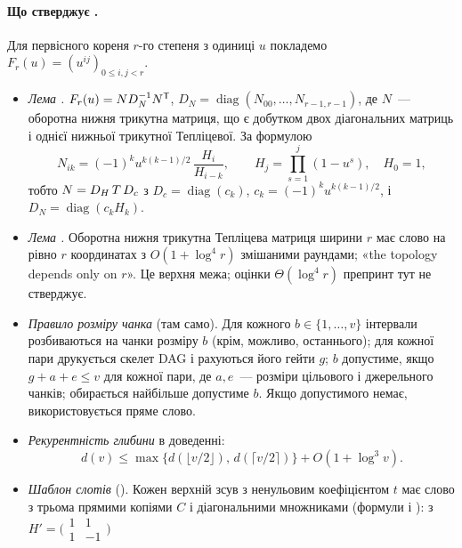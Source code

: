 \documentclass[11pt]{article}
\theoremstyle{plain}
\DeclareMathOperator{\diag}{diag}
\newcommand{\en}[1]{\foreignlanguage{english}{#1}}
\begin{document}
\paragraph{Що стверджує .}
Для первісного кореня $r$-го степеня з одиниці $u$ покладемо $F_r(u)=(u^{ij})_{0\le i,j<r}$.
\begin{itemize}
\item \emph{Лема .} $F_r(u)=N D_N^{-1}N^{\mathsf{T}}$, $D_N=\diag(N_{00},\dots,N_{r-1,r-1})$, де $N$~--- оборотна нижня трикутна матриця, що є добутком двох діагональних матриць і однієї нижньої трикутної Тепліцевої. За формулою 
\begin{equation}\label{eq:newton}
N_{ik}=(-1)^k u^{k(k-1)/2}\,\frac{H_i}{H_{i-k}},\qquad H_j=\prod_{s=1}^{j}(1-u^s),\quad H_0=1,
\end{equation}
тобто $N=D_H\,T\,D_c$ з $D_c=\diag(c_k)$, $c_k=(-1)^k u^{k(k-1)/2}$, і $D_N=\diag(c_kH_k)$.
\item \emph{Лема .} Оборотна нижня трикутна Тепліцева матриця ширини $r$ має слово на рівно $r$ координатах з $O(1+\log^4 r)$ змішаними раундами; «\en{the topology depends only on $r$}». Це верхня межа; оцінки $\Theta(\log^4 r)$ препринт тут не стверджує.
\item \emph{Правило розміру чанка} (там само). Для кожного $b\in\{1,\dots,v\}$ інтервали розбиваються на чанки розміру $b$ (крім, можливо, останнього); для кожної пари друкується скелет DAG і рахуються його гейти $g$; $b$ допустиме, якщо $g+a+e\le v$ для кожної пари, де $a,e$~--- розміри цільового і джерельного чанків; обирається найбільше допустиме $b$. Якщо допустимого немає, використовується пряме слово.
\item \emph{Рекурентність глибини} в доведенні:
\begin{equation}\label{eq:depth-rec}
d(v)\le\max\bigl\{d(\lfloor v/2\rfloor),\,d(\lceil v/2\rceil)\bigr\}+O(1+\log^3 v).
\end{equation}
\item \emph{Шаблон слотів} (). Кожен верхній зсув з ненульовим коефіцієнтом $t$ має слово з трьома прямими копіями $C$ і діагональними множниками (формули  і ): з $H'=\bigl(\begin{smallmatrix}1&1\\1&-1\end{smallmatrix}\bigr)$
\begin{equation}\label{eq:K}
\begin{gathered}

\end{gathered}
\end{equation}
\end{itemize}
\end{document}
